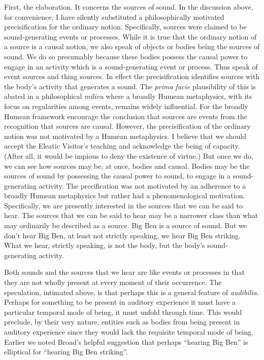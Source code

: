 First, the elaboration. It concerns the sources of sound. In the discussion above, for convenience, I have silently substituted a philosophically motivated precisification for the ordinary notion. Specifically, sources were claimed to be sound-generating events or processes. While it is true that the ordinary notion of a source is a causal notion, we also speak of objects or bodies being the sources of sound. We do so presumably because these bodies possess the causal power to engage in an activity which is a sound-generating event or process. Thus \citet{Casati:2013ca} speak of event sources and thing sources. In effect the precisification identifies sources with the body's activity that generates a sound. The \emph{prima facie} plausibility of this is abated in a philosophical \emph{milieu} where a broadly Humean metaphysics, with its focus on regularities among events, remains widely influential. For the broadly Humean framework encourage the conclusion that sources are events from the recognition that sources are causal. However, the precisification of the ordinary notion was not motivated by a Humean metaphysics. I believe that we should accept the Eleatic Visitor's teaching and acknowledge the being of capacity. (After all, it would be impious to deny the existence of virtue.) But once we do, we can see how sources may be, at once, bodies and causal. Bodies may be the sources of sound by possessing the causal power to sound, to engage in a sound-generating activity. The precification was not motivated by an adherence to a broadly Humean metaphysics but rather had a phenomenological motivation. Specifically, we are presently interested in the sources that we can be said to hear. The sources that we can be said to hear may be a narrower class than what may ordinarily be described as a source. Big Ben is a source of sound. But we don't hear Big Ben, at least not strictly speaking, we hear Big Ben striking. What we hear, strictly speaking, is not the body, but the body's sound-generating activity. 

Both sounds and the sources that we hear are like events or processes in that they are not wholly present at every moment of their occurrence. The speculation, intimated above, is that perhaps this is a general feature of \emph{audibilia}. Perhaps for something to be present in auditory experience it must have a particular temporal mode of being, it must unfold through time. This would preclude, by their very nature, entities such as bodies from being present in auditory experience since they would lack the requisite temporal mode of being. Earlier we noted Broad's helpful suggestion that perhaps ``hearing Big Ben'' is elliptical for ``hearing Big Ben striking''. 

